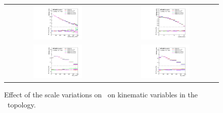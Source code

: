 \begin{figure}[p]
\begin{center}
\begin{tabular}{cc}
\includegraphics[width=0.48\textwidth]{Modeling/Figures/scales_tt2bq_q1_pt_norm} &
\includegraphics[width=0.48\textwidth]{Modeling/Figures/scales_tt2bq_q1_eta_norm} \\
\includegraphics[width=0.48\textwidth]{Modeling/Figures/scales_tt2bq_top_pt_norm} &
\includegraphics[width=0.48\textwidth]{Modeling/Figures/scales_tt2bq_ttbar_pt_norm} \\
\end{tabular}
\caption{Effect of the scale variations  on \ShOL\ on kinematic variables in the \ttbb\ topology.}
\label{fig:scales_tt2b}
\end{center}
\end{figure}
